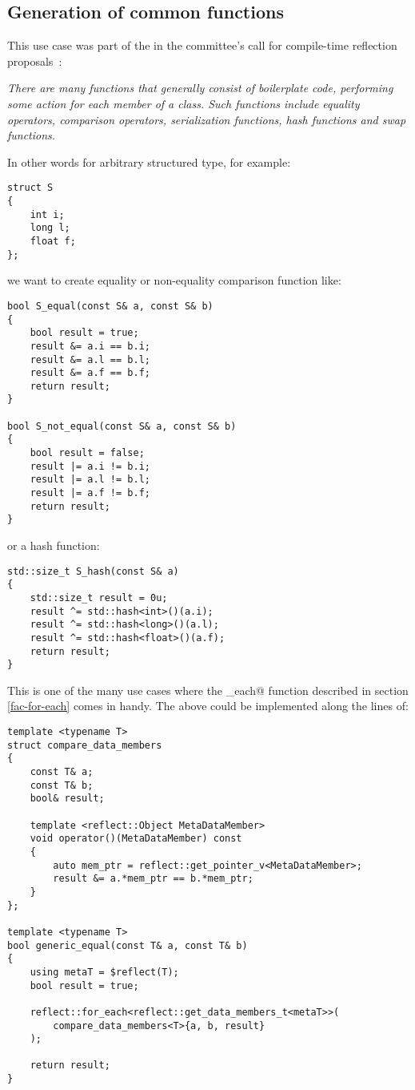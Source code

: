 \subsection{Generation of common functions}
\label{use-case-common-func}

This use case was part of the  in the committee's
call for compile-time reflection proposals~\cite{ISOCPP-N3814}: 

{\em There are many functions that generally consist of boilerplate code,
performing some action for each member of a class. Such functions include
equality operators, comparison operators, serialization functions,
hash functions and swap functions.
}

In other words for arbitrary structured type, for example:

\begin{verbatim}
struct S
{
	int i;
	long l;
	float f;
};
\end{verbatim}

we want to create equality or non-equality comparison function like:

\begin{verbatim}
bool S_equal(const S& a, const S& b)
{
	bool result = true;
	result &= a.i == b.i;
	result &= a.l == b.l;
	result &= a.f == b.f;
	return result;
}

bool S_not_equal(const S& a, const S& b)
{
	bool result = false;
	result |= a.i != b.i;
	result |= a.l != b.l;
	result |= a.f != b.f;
	return result;
}
\end{verbatim}

or a hash function:

\begin{verbatim}
std::size_t S_hash(const S& a)
{
	std::size_t result = 0u;
	result ^= std::hash<int>()(a.i);
	result ^= std::hash<long>()(a.l);
	result ^= std::hash<float>()(a.f);
	return result;
}
\end{verbatim}

This is one of the many use cases where the \verb@for_each@ function
described in section \ref{fac-for-each} comes in handy. The above could be
implemented along the lines of:

\begin{verbatim}
template <typename T>
struct compare_data_members
{
	const T& a;
	const T& b;
	bool& result;

	template <reflect::Object MetaDataMember>
	void operator()(MetaDataMember) const
	{
		auto mem_ptr = reflect::get_pointer_v<MetaDataMember>;
		result &= a.*mem_ptr == b.*mem_ptr;
	}
};

template <typename T>
bool generic_equal(const T& a, const T& b)
{
	using metaT = $reflect(T);
	bool result = true;

	reflect::for_each<reflect::get_data_members_t<metaT>>(
		compare_data_members<T>{a, b, result}
	);

	return result;
}
\end{verbatim}

